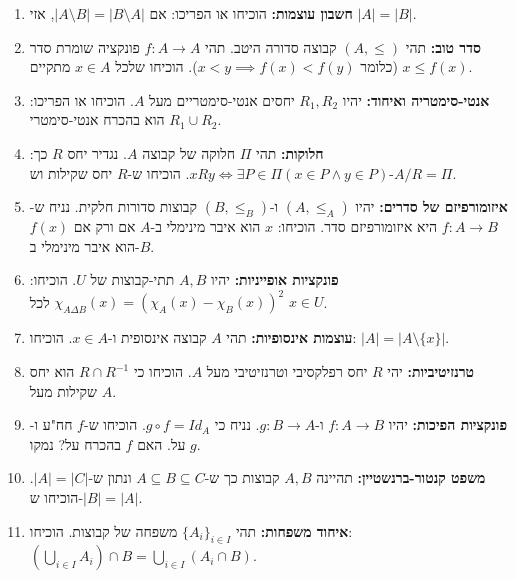 \documentclass[a4paper,11pt]{article}
\begin{document}
\begin{enumerate}
    \item \textbf{חשבון עוצמות:}
          הוכיחו או הפריכו: אם \(|A \setminus B| = |B \setminus A|\), אזי \(|A| = |B|\).

    \item \textbf{סדר טוב:}
          תהי \((A, \le)\) קבוצה סדורה היטב. תהי \(f: A \to A\) פונקציה שומרת סדר (כלומר \(x < y \implies f(x) < f(y)\)). הוכיחו שלכל \(x \in A\) מתקיים \(x \le f(x)\).

    \item \textbf{אנטי-סימטריה ואיחוד:}
          יהיו \(R_1, R_2\) יחסים אנטי-סימטריים מעל \(A\).
          הוכיחו או הפריכו: \(R_1 \cup R_2\) הוא בהכרח אנטי-סימטרי.

    \item \textbf{חלוקות:}
          תהי \(\Pi\) חלוקה של קבוצה \(A\). נגדיר יחס \(R\) כך: \(xRy \iff \exists P \in \Pi (x \in P \land y \in P)\). הוכיחו ש-\(R\) יחס שקילות וש-\(A/R = \Pi\).

    \item \textbf{איזומורפיזם של סדרים:}
          יהיו \((A, \le_A)\) ו-\((B, \le_B)\) קבוצות סדורות חלקית. נניח ש-\(f: A \to B\) היא איזומורפיזם סדר.
          הוכיחו: \(x\) הוא איבר מינימלי ב-\(A\) אם ורק אם \(f(x)\) הוא איבר מינימלי ב-\(B\).

    \item \textbf{פונקציות אופייניות:}
          יהיו \(A, B\) תתי-קבוצות של \(U\). הוכיחו: \(\chi_{A \Delta B}(x) = (\chi_A(x) - \chi_B(x))^2\) לכל \(x \in U\).

    \item \textbf{עוצמות אינסופיות:}
          תהי \(A\) קבוצה אינסופית ו-\(x \in A\). הוכיחו: \(|A| = |A \setminus \{x\}|\).

    \item \textbf{טרנזיטיביות:}
          יהי \(R\) יחס רפלקסיבי וטרנזיטיבי מעל \(A\). הוכיחו כי \(R \cap R^{-1}\) הוא יחס שקילות מעל \(A\).

    \item \textbf{פונקציות הפיכות:}
          יהיו \(f: A \to B\) ו-\(g: B \to A\). נניח כי \(g \circ f = Id_A\).
          הוכיחו ש-\(f\) חח"ע ו-\(g\) על. האם \(f\) בהכרח על? נמקו.

    \item \textbf{משפט קנטור-ברנשטיין:}
          תהיינה \(A, B\) קבוצות כך ש-\(A \subseteq B \subseteq C\) ונתון ש-\(|A| = |C|\). הוכיחו ש-\(|B| = |A|\).

    \item \textbf{איחוד משפחות:}
          תהי \(\{A_i\}_{i \in I}\) משפחה של קבוצות.
          הוכיחו: \((\bigcup_{i \in I} A_i) \cap B = \bigcup_{i \in I} (A_i \cap B)\).

\end{enumerate}
\end{document}
